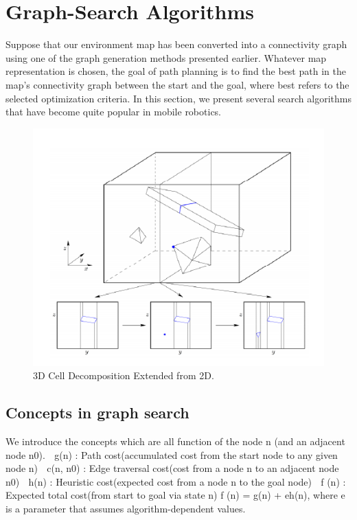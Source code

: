 \documentclass[twoside]{article}
\begin{document}
\section{Graph-Search Algorithms}
Suppose that our environment map has been converted into a connectivity graph using one of the graph generation methods presented earlier. Whatever map representation is chosen, the goal of path planning is to find the best path in the map’s connectivity graph between the start and the goal, where best refers to the selected optimization criteria. In this section, we present several search algorithms that have become
quite popular in mobile robotics.

\begin{figure}[h]
\begin{center}
\includegraphics{fig15_7.PNG}
\caption{3D Cell Decomposition Extended from 2D.}
\end{center}
\end{figure}

\subsection{Concepts in graph search}
We introduce the concepts which are all function of the node n (and an adjacent node n0).
 g(n) : Path cost(accumulated cost from the start node to any given node n)
 c(n, n0) : Edge traversal cost(cost from a node n to an adjacent node n0)
 h(n) : Heuristic cost(expected cost from a node n to the goal node)
 f (n) : Expected total cost(from start to goal via state n)
f (n) = g(n) + eh(n), where e is a parameter that assumes algorithm-dependent values.
\end{document}
